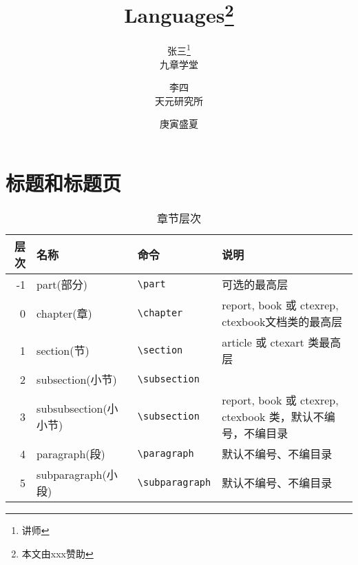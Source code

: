 \documentclass{report}
\title{Languages\thanks{本文由xxx赞助}}  %
\author{张三\thanks{讲师}\\九章学堂 \and 李四\\天元研究所}
\date{庚寅盛夏}  %
\begin{document}
	\maketitle   %
	\tableofcontents	%
	
	
	\part{标题和标题页}
		\begin{table}
			\begin{center}  %
				\caption{章节层次}
				\begin{tabular}{rlll}  %
					\toprule
					层次 & 名称 & 命令 & 说明 \\
					\midrule
					-1 & part(部分) & \verb|\part| & 可选的最高层 \\
					
					0 & chapter(章) & \verb|\chapter| & report, book 或 ctexrep, ctexbook文档类的最高层 \\
					
					1 & section(节) & \verb|\section| & article 或 ctexart 类最高层 \\
					
					2 & subsection(小节) & \verb|\subsection| & {} \\
					
					3 & subsubsection(小小节) & \verb|\subsection| & report, book 或 ctexrep, ctexbook 类，默认不编号，不编目录 \\
					
					4 & paragraph(段) & \verb|\paragraph| & 默认不编号、不编目录 \\
					
					5 & subparagraph(小段) & \verb|\subparagraph| & 默认不编号、不编目录 \\
					\bottomrule
				\end{tabular}
			\end{center}
		\end{table}
		
\end{document}
